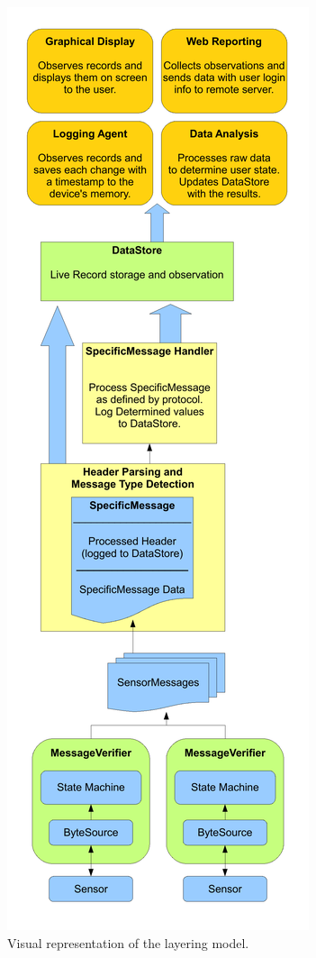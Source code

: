 \documentclass[conference,a4paper]{IEEEtran}
\begin{document}
\begin{figure}[t]
\centering
\includegraphics[scale=0.355]{./figures/column.pdf}
\caption{Visual representation of the layering model.}
\label{figArch}
\end{figure}




\end{document}
